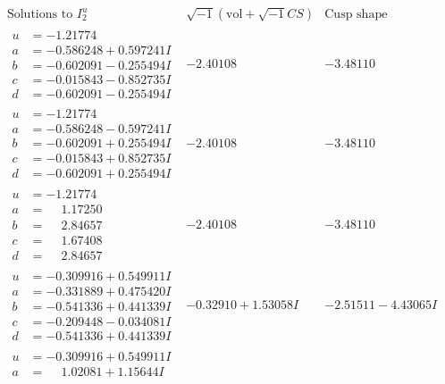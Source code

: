 \documentclass[1p]{elsarticle_modified}
\theoremstyle{definition}
\newcommand{\I}{\sqrt{-1}}
\begin{document}
$$\begin{array}{c|c|c}  
\text{Solutions to }I^u_{2}& \I (\text{vol} + \sqrt{-1}CS) & \text{Cusp shape}\\
 \hline 
\begin{aligned}
u &= -1.21774\phantom{ +0.000000I} \\
a &= -0.586248 + 0.597241 I \\
b &= -0.602091 - 0.255494 I \\
c &= -0.015843 - 0.852735 I \\
d &= -0.602091 - 0.255494 I\end{aligned}
 & -2.40108\phantom{ +0.000000I} & -3.48110\phantom{ +0.000000I} \\ \hline\begin{aligned}
u &= -1.21774\phantom{ +0.000000I} \\
a &= -0.586248 - 0.597241 I \\
b &= -0.602091 + 0.255494 I \\
c &= -0.015843 + 0.852735 I \\
d &= -0.602091 + 0.255494 I\end{aligned}
 & -2.40108\phantom{ +0.000000I} & -3.48110\phantom{ +0.000000I} \\ \hline\begin{aligned}
u &= -1.21774\phantom{ +0.000000I} \\
a &= \phantom{-}1.17250\phantom{ +0.000000I} \\
b &= \phantom{-}2.84657\phantom{ +0.000000I} \\
c &= \phantom{-}1.67408\phantom{ +0.000000I} \\
d &= \phantom{-}2.84657\phantom{ +0.000000I}\end{aligned}
 & -2.40108\phantom{ +0.000000I} & -3.48110\phantom{ +0.000000I} \\ \hline\begin{aligned}
u &= -0.309916 + 0.549911 I \\
a &= -0.331889 + 0.475420 I \\
b &= -0.541336 + 0.441339 I \\
c &= -0.209448 - 0.034081 I \\
d &= -0.541336 + 0.441339 I\end{aligned}
 & -0.32910 + 1.53058 I & -2.51511 - 4.43065 I \\ \hline\begin{aligned}
u &= -0.309916 + 0.549911 I \\
a &= \phantom{-}1.02081 + 1.15644 I \\

\end{aligned}
\end{array}$$
\end{document}
